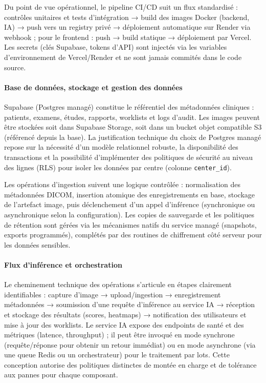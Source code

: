 Du point de vue opérationnel, le pipeline CI/CD suit un flux standardisé : contrôles unitaires et tests d'intégration → build des images Docker (backend, IA) → push vers un registry privé → déploiement automatique sur Render via webhook ; pour le frontend : push → build statique → déploiement par Vercel. Les secrets (clés Supabase, tokens d'API) sont injectés via les variables d'environnement de Vercel/Render et ne sont jamais commités dans le code source.

\paragraph{Base de données, stockage et gestion des données}
Supabase (Postgres managé) constitue le référentiel des métadonnées cliniques : patients, examens, études, rapports, worklists et logs d'audit. Les images peuvent être stockées soit dans Supabase Storage, soit dans un bucket objet compatible S3 (référencé depuis la base). La justification technique du choix de Postgres managé repose sur la nécessité d'un modèle relationnel robuste, la disponibilité des transactions et la possibilité d'implémenter des politiques de sécurité au niveau des lignes (RLS) pour isoler les données par centre (colonne \texttt{center\_id}).

Les opérations d'ingestion suivent une logique contrôlée : normalisation des métadonnées DICOM, insertion atomique des enregistrements en base, stockage de l'artefact image, puis déclenchement d'un appel d'inférence (synchronique ou asynchronique selon la configuration). Les copies de sauvegarde et les politiques de rétention sont gérées via les mécanismes natifs du service managé (snapshots, exports programmés), complétés par des routines de chiffrement côté serveur pour les données sensibles.

\paragraph{Flux d'inférence et orchestration}
Le cheminement technique des opérations s'articule en étapes clairement identifiables : capture d'image → upload/ingestion → enregistrement métadonnées → soumission d'une requête d'inférence au service IA → réception et stockage des résultats (scores, heatmaps) → notification des utilisateurs et mise à jour des worklists. Le service IA expose des endpoints de santé et des métriques (latence, throughput) ; il peut être invoqué en mode synchrone (requête/réponse pour obtenir un retour immédiat) ou en mode asynchrone (via une queue Redis ou un orchestrateur) pour le traitement par lots. Cette conception autorise des politiques distinctes de montée en charge et de tolérance aux pannes pour chaque composant.

